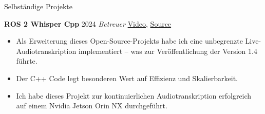 \begin{rubric}{Selbständige Projekte}

\entry*[] \textbf{ROS 2 Whisper Cpp} \hfill 2024 \newline 
\emph{Betreuer} \hfill \href{https://github.com/ros-ai/ros2_whisper/blob/main/doc/harry_potter_sample.gif}{Video}, \href{https://github.com/ros-ai/ros2_whisper}{\faGithub Source} \newline  
\vspace{\CVItemizeHeaderSpacing} \begin{itemize}[leftmargin=*, rightmargin=1cm]
	\setlength{\itemsep}{\CVItemizeSpacing}
	\item Als Erweiterung dieses Open-Source-Projekts habe ich eine unbegrenzte Live-Audiotranskription implementiert -- was zur Veröffentlichung der Version 1.4 führte. 
	\item Der C++ Code legt besonderen Wert auf Effizienz und Skalierbarkeit.
	\item Ich habe dieses Projekt zur kontinuierlichen Audiotranskription erfolgreich auf einem Nvidia Jetson Orin NX durchgeführt.
\end{itemize}  


\end{rubric}
